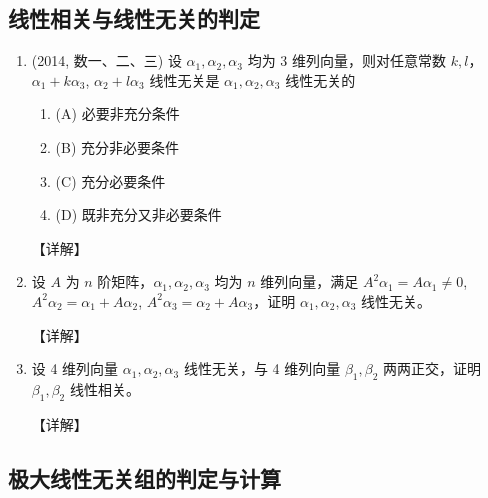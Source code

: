 \documentclass[12pt, a4paper, oneside, UTF8]{ctexbook}
\begin{document}
\subsection{线性相关与线性无关的判定}

\begin{enumerate}[label=\arabic*.,start=3]
    \item (2014, 数一、二、三) 设 $\alpha_1, \alpha_2, \alpha_3$ 均为 3 维列向量，则对任意常数 $k, l$，$\alpha_1 + k\alpha_3$, $\alpha_2 + l\alpha_3$ 线性无关是 $\alpha_1, \alpha_2, \alpha_3$ 线性无关的
    \begin{enumerate}
        \item (A) 必要非充分条件
        \item (B) 充分非必要条件
        \item (C) 充分必要条件
        \item (D) 既非充分又非必要条件
    \end{enumerate}
    
    \begin{solution}
    【详解】
    \end{solution}
    
    \item 设 $A$ 为 $n$ 阶矩阵，$\alpha_1, \alpha_2, \alpha_3$ 均为 $n$ 维列向量，满足 $A^2\alpha_1 = A\alpha_1 \neq 0$, $A^2\alpha_2 = \alpha_1 + A\alpha_2$,
    $A^2\alpha_3 = \alpha_2 + A\alpha_3$，证明 $\alpha_1, \alpha_2, \alpha_3$ 线性无关。
    
    \begin{solution}
    【详解】
    \end{solution}
    
    \item 设 4 维列向量 $\alpha_1, \alpha_2, \alpha_3$ 线性无关，与 4 维列向量 $\beta_1, \beta_2$ 两两正交，证明 $\beta_1, \beta_2$ 线性相关。
    
    \begin{solution}
    【详解】
    \end{solution}
\end{enumerate}

\subsection{极大线性无关组的判定与计算}
\end{document}
